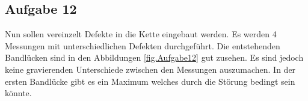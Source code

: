 \subsection{Aufgabe 12}
Nun sollen vereinzelt Defekte in die Kette eingebaut werden.
Es werden 4 Messungen mit unterschiedlichen Defekten durchgeführt.
Die entstehenden Bandlücken sind in den Abbildungen \ref{fig.Aufgabe12} gut zusehen.
Es sind jedoch keine gravierenden Unterschiede zwischen den Messungen auszumachen.
In der ersten Bandlücke gibt es ein Maximum welches durch die Störung bedingt sein könnte.



